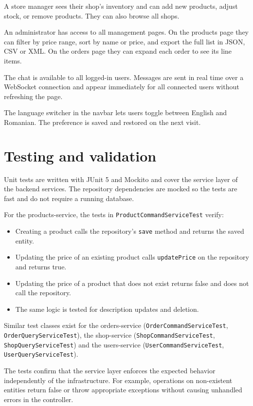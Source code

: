 \documentclass[12pt, a4paper]{article}
\begin{document}
A store manager sees their shop's inventory and can add new products, adjust stock, or
remove products. They can also browse all shops.

An administrator has access to all management pages. On the products page they can filter
by price range, sort by name or price, and export the full list in JSON, CSV or XML. On the
orders page they can expand each order to see its line items.

The chat is available to all logged-in users. Messages are sent in real time over a WebSocket
connection and appear immediately for all connected users without refreshing the page.

The language switcher in the navbar lets users toggle between English and Romanian. The
preference is saved and restored on the next visit.

\section{Testing and validation}

Unit tests are written with JUnit 5 and Mockito and cover the service layer of the backend
services. The repository dependencies are mocked so the tests are fast and do not require
a running database.

For the products-service, the tests in \texttt{ProductCommandServiceTest} verify:
\begin{itemize}
    \item Creating a product calls the repository's \texttt{save} method and returns the saved entity.
    \item Updating the price of an existing product calls \texttt{updatePrice} on the repository and returns true.
    \item Updating the price of a product that does not exist returns false and does not call the repository.
    \item The same logic is tested for description updates and deletion.
\end{itemize}

Similar test classes exist for the orders-service (\texttt{OrderCommandServiceTest},
\texttt{OrderQueryServiceTest}), the shop-service (\texttt{ShopCommandServiceTest},
\texttt{ShopQueryServiceTest}) and the users-service (\texttt{UserCommandServiceTest},
\texttt{UserQueryServiceTest}).

The tests confirm that the service layer enforces the expected behavior independently of the
infrastructure. For example, operations on non-existent entities return false or throw
appropriate exceptions without causing unhandled errors in the controller.
\end{document}
